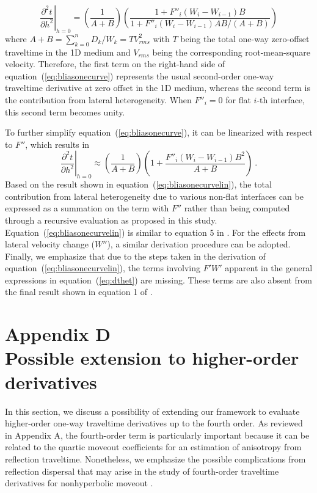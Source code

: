 \begin{equation}
\label{eq:bliasonecurve}
\left. \frac{\partial^2 t }{\partial h^2} \right\rvert_{h=0} = \left( \frac{1}{A +B} \right) \left( \frac{1+  F''_i (W_i - W_{i-1})B }{1+  F''_i (W_i - W_{i-1})AB /(A+B)} \right)
\end{equation}
where $ A+B = \sum^n_{k=0} D_k/W_k = T V^2_{rms}$ with $T$ being the total one-way zero-offset traveltime in the 1D medium and $V_{rms}$ being the corresponding root-mean-square velocity. Therefore, the first term on the right-hand side of equation~(\ref{eq:bliasonecurve}) represents the usual second-order one-way traveltime derivative at zero offset in the 1D medium, whereas the second term is the contribution from lateral heterogeneity. When $F''_i =0$ for flat $i$-th interface, this second term becomes unity.

To further simplify equation~(\ref{eq:bliasonecurve}), it can be linearized with respect to $F''$, which results in
\begin{equation}
\label{eq:bliasonecurvelin}
\left. \frac{\partial^2 t }{\partial h^2} \right\rvert_{h=0} \approx \left( \frac{1}{A +B} \right) \left( 1+  \frac{F''_i (W_i - W_{i-1})B^2}{A+B} \right)~.
\end{equation}
Based on the result shown in equation~(\ref{eq:bliasonecurvelin}), the total contribution from lateral heterogeneity due to various non-flat interfaces can be expressed as a summation  on the term with $F''$ rather than being computed through a recursive evaluation as proposed in this study. Equation~(\ref{eq:bliasonecurvelin}) is similar to equation 5 in \cite{blias2009stacking}. For the effects from lateral velocity change ($W''$), a similar derivation procedure can be adopted. Finally, we emphasize that due to the steps taken in the derivation of equation~(\ref{eq:bliasonecurvelin}), the terms involving $F'W'$ apparent in the general expressions in equation~(\ref{eq:dthet}) are missing. These terms are also absent from the final result shown in equation 1 of \cite{blias2009stacking}.



\section{Appendix D \\ Possible extension to higher-order derivatives}
In this section, we discuss a possibility of extending our framework to evaluate higher-order one-way traveltime derivatives up to the fourth order. As reviewed in Appendix A, the fourth-order term is particularly important because it can be related to the quartic moveout coefficients for an estimation of anisotropy from reflection traveltime. Nonetheless, we emphasize the possible complications from reflection dispersal that may arise in the study of fourth-order traveltime derivatives for nonhyperbolic moveout \cite[e.g.,][]{pech2003}. 

